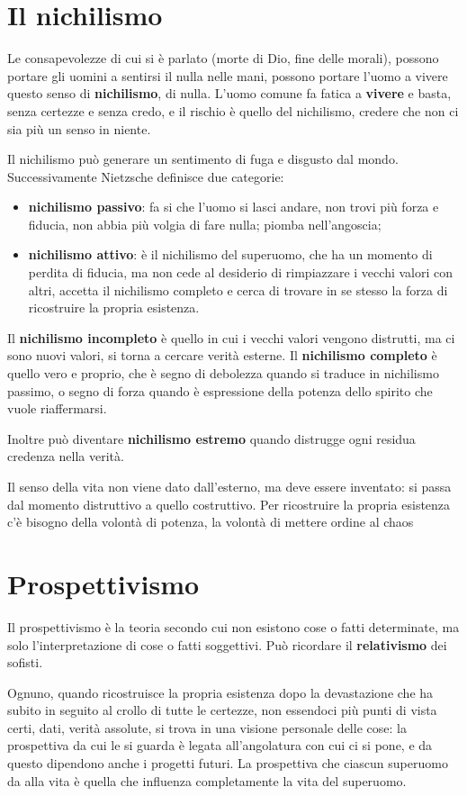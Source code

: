 \documentclass[a4paper, twoside, titlepage]{book}
\begin{document}
\section{Il nichilismo}

Le consapevolezze di cui si è parlato (morte di Dio, fine delle morali), possono portare gli uomini a sentirsi il nulla nelle mani, possono portare l'uomo a vivere questo senso di \textbf{nichilismo}, di nulla.
L'uomo comune fa fatica a \textbf{vivere} e basta, senza certezze e senza credo, e il rischio è quello del nichilismo, credere che non ci sia più un senso in niente.

Il nichilismo può generare un sentimento di fuga e disgusto dal mondo. Successivamente Nietzsche definisce due categorie:
\begin{itemize}
\item \textbf{nichilismo passivo}: fa si che l'uomo si lasci andare, non trovi più forza e fiducia, non abbia più volgia di fare nulla; piomba nell'angoscia; 
\item \textbf{nichilismo attivo}: è il nichilismo del superuomo, che ha un momento di perdita di fiducia, ma non cede al desiderio di rimpiazzare i vecchi valori con altri, accetta il nichilismo completo e cerca di trovare in se stesso la forza di ricostruire la propria esistenza.
\end{itemize}

Il \textbf{nichilismo incompleto} è quello in cui i vecchi valori vengono distrutti, ma ci sono nuovi valori, si torna a cercare verità esterne.
Il \textbf{nichilismo completo} è quello vero e proprio, che è segno di debolezza quando si traduce in nichilismo passimo, o segno di forza quando è espressione della potenza dello spirito che vuole riaffermarsi.

Inoltre può diventare \textbf{nichilismo estremo} quando distrugge ogni residua credenza nella verità.

Il senso della vita non viene dato dall'esterno, ma deve essere inventato: si passa dal momento distruttivo a quello costruttivo. Per ricostruire la propria esistenza c'è bisogno della volontà di potenza, la volontà di mettere ordine al chaos

\section{Prospettivismo}

Il prospettivismo è la teoria secondo cui non esistono cose o fatti determinate, ma solo l'interpretazione di cose o fatti soggettivi. 
Può ricordare il \textbf{relativismo} dei sofisti. 

Ognuno, quando ricostruisce la propria esistenza dopo la devastazione che ha subito in seguito al crollo di tutte le certezze, non essendoci più punti di vista certi, dati, verità assolute, si trova in una visione personale delle cose: la prospettiva da cui le si guarda è legata all'angolatura con cui ci si pone, e da questo dipendono anche i progetti futuri.
La prospettiva che ciascun superuomo da alla vita è quella che influenza completamente la vita del superuomo.
\end{document}
